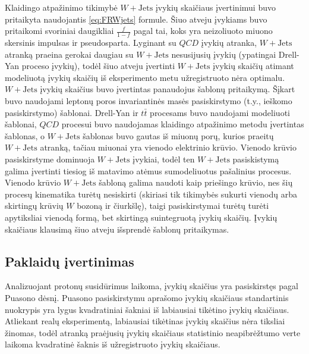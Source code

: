 \documentclass[a4paper, 12pt, oneside]{article}
\newcommand{\ttbar}{t\bar{t}}
\newcommand{\WJets}{W\! +\!\mathrm{Jets}}
\newcommand{\QCD}{QC\! D}
\newlength\q
\begin{document}
Klaidingo atpažinimo tikimybė $\WJets$ įvykių skaičiaus įvertinimui buvo pritaikyta naudojantis \ref{eq:FRWjets} formule.
Šiuo atveju įvykiams buvo pritaikomi svoriniai daugikliai $\frac{f}{1-f}$ pagal tai, koks yra neizoliuoto miuono skersinis
impulsas ir pseudosparta.
Lyginant su $\QCD$ įvykių atranka, $\WJets$ atranką praeina gerokai daugiau su $\WJets$ nesusijusių įvykių
(ypatingai Drell-Yan proceso įvykių), todėl šiuo atveju įvertinti $\WJets$ įvykių skaičių atimant modeliuotą įvykių skaičių
iš eksperimento metu užregistruoto nėra optimalu.
$\WJets$ įvykių skaičius buvo įvertintas panaudojus šablonų pritaikymą.
Šįkart buvo naudojami leptonų poros invariantinės masės pasiskirstymo (t.y., ieškomo pasiskirstymo) šablonai.
Drell-Yan ir $\ttbar$ procesams buvo naudojami modeliuoti šablonai, $\QCD$ procesui buvo naudojamas klaidingo atpažinimo
metodu įvertintas šablonas, o $\WJets$ šablonas buvo gautas iš miuonų porų, kurios praeitų $\WJets$ atranką, tačiau
miuonai yra vienodo elektrinio krūvio.
Vienodo krūvio pasiskirstyme dominuoja $\WJets$ įvykiai, todėl ten $\WJets$ pasiskistymą galima įvertinti tiesiog iš matavimo
atėmus sumodeliuotus pašalinius procesus.
Vienodo krūvio $\WJets$ šabloną galima naudoti kaip priešingo krūvio, nes šių procesų kinematika turėtų nesiskirti (skiriasi
tik tikimybės sukurti vienodų arba skirtingų krūvių $W$ bozoną ir čiurkšlę), taigi pasiskirstymai turėtų turėti apytiksliai
vienodą formą, bet skirtingą suintegruotą įvykių skaičių.
Įvykių skaičiaus klausimą šiuo atveju išsprendė šablonų pritaikymas.


\subsection{Paklaidų įvertinimas}\label{sec:uncertainties}

Analizuojant protonų susidūrimus laikoma, įvykių skaičius yra pasiskirstęs pagal Puasono dėsnį.
Puasono pasiskirstymu aprašomo įvykių skaičiaus standartinis nuokrypis yra lygus kvadratiniai šakniai iš labiausiai
tikėtino įvykių skaičiaus.
Atliekant realų eksperimentą, labiausiai tikėtinas įvykių skaičius nėra tiksliai žinomas, todėl atranką praėjusių
įvykių skaičiaus statistinio neapibrėžtumo verte laikoma kvadratinė šaknis iš užregistruoto įvykių skaičiaus.
\end{document}
